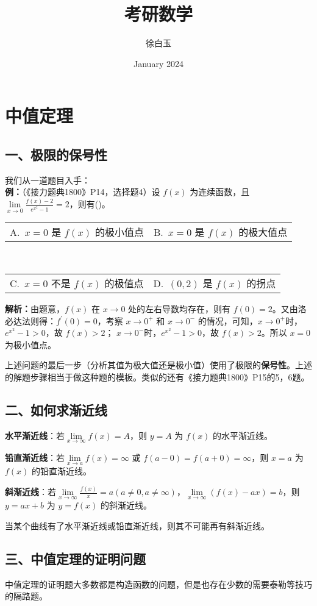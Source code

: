\documentclass[a5paper]{ctexart}
\title{考研数学}
\author{徐白玉}
\date{January 2024}
\makeatletter
\newcommand{\twp} [4] { \\
	\begin{tabular} {*{2}{@{}p{7cm}}}
		A.~#1 & B.~#2
	\end{tabular} \\
	\begin{tabular} {*{2}{@{}p{7cm}}}
		C.~#3 & D.~#4
	\end{tabular}
}
\makeatother
\begin{document}
	\maketitle
	\thispagestyle{empty}
	\newpage
	\setcounter{page}{1}
	\tableofcontents
	
	\newpage
	\setcounter{page}{1}
	\section{中值定理}
	\subsection*{一、极限的保号性}
	我们从一道题目入手：\\
	\textbf{例：}（《接力题典1800》P14，选择题4）设 $f(x)$ 为连续函数，且 $\lim\limits_{x \to 0} \frac{f(x) - 2}{e^{x^2} - 1} = 2$，则有(\quad)。
	\twp{$x = 0$ 是 $f(x)$ 的极小值点}{$x = 0$ 是 $f(x)$ 的极大值点\\}{$x = 0$ 不是 $f(x)$ 的极值点}{$(0, 2)$ 是 $f(x)$ 的拐点}
	
	\textbf{解析：}由题意，$f(x)$ 在 $x \to 0$ 处的左右导数均存在，则有 $f(0) = 2$。又由洛必达法则得：$f^{'}(0) = 0$，考察 $x \to 0^+$ 和 $x \to 0^-$ 的情况，可知，$x \to 0^+$时，$e^{x^2} - 1 > 0$，故 $f(x) > 2$； $x \to 0^-$时，$e^{x^2} - 1 > 0$，故 $f(x) > 2$。所以 $x = 0$ 为极小值点。
	
	上述问题的最后一步（分析其值为极大值还是极小值）使用了极限的\textbf{保号性}。上述的解题步骤相当于做这种题的模板。类似的还有《接力题典1800》P15的5，6题。
	
	\subsection*{二、如何求渐近线}
	\textbf{水平渐近线}：若$\lim\limits_{x \to \infty} f(x) = A$，则 $y = A$ 为 $f(x)$ 的水平渐近线。
	
	\textbf{铅直渐近线}：若$\lim\limits_{x \to a} f(x) = \infty$ 或 $f(a - 0) = f(a + 0) = \infty$，则 $x = a$ 为 $f(x)$ 的铅直渐近线。
	
	\textbf{斜渐近线}：若$\lim\limits_{x \to \infty} \frac{f(x)}{x} = a(a \ne 0, a \ne \infty)$，$\lim\limits_{x \to \infty} (f(x) - ax) = b$，则$y = ax + b$ 为 $y = f(x)$ 的斜渐近线。
	
	当某个曲线有了水平渐近线或铅直渐近线，则其不可能再有斜渐近线。
	
	\subsection*{三、中值定理的证明问题}
	中值定理的证明题大多数都是构造函数的问题，但是也存在少数的需要泰勒等技巧的隔路题。
	
\end{document}
